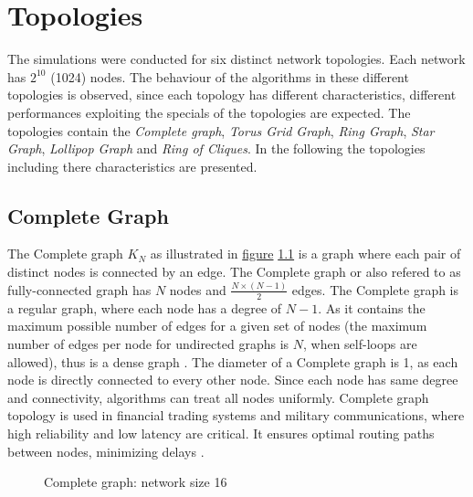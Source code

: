 \chapter{Topologies}\label{chap:topologies}
The simulations were conducted for six distinct network topologies. Each network has $2^{10}$ (1024) nodes. The behaviour of the algorithms in these different topologies is observed, since each topology has different characteristics, different performances exploiting the specials of the topologies are expected. The topologies contain the \textit{Complete graph}, \textit{Torus Grid Graph}, \textit{Ring Graph}, \textit{Star Graph}, \textit{Lollipop Graph} and \textit{Ring of Cliques}. In the following the topologies including there characteristics are presented. 

\section{Complete Graph}\label{sec:2completegraph}
The Complete graph $K_N$ as illustrated in \hyperref[fig:completegraphDemo]{figure} \ref{fig:completegraphDemo} is a graph where each pair of distinct nodes is connected by an edge. The Complete graph or also refered to as fully-connected graph has $N$ nodes and $\frac{N\times(N-1)}{2}$ edges. The Complete graph is a regular graph, where each node has a degree of $N-1$. As it contains the maximum possible number of edges for a given set of nodes (the maximum number of edges per node for undirected graphs is $N$, when self-loops are allowed), thus is a dense graph \cite{GraphTheorySchindelhaauer2021}. The diameter of a Complete graph is 1, as each node is directly connected to every other node. Since each node has same degree and connectivity, algorithms can treat all nodes uniformly. Complete graph topology is used in financial trading systems and military communications, where high reliability and low latency are critical. It ensures optimal routing paths between nodes, minimizing delays \cite{Banerjee2001}.

\begin{figure}[H]
    \centering
    
    \caption{Complete graph: network size 16}
    \label{fig:completegraphDemo}
\end{figure}
 
